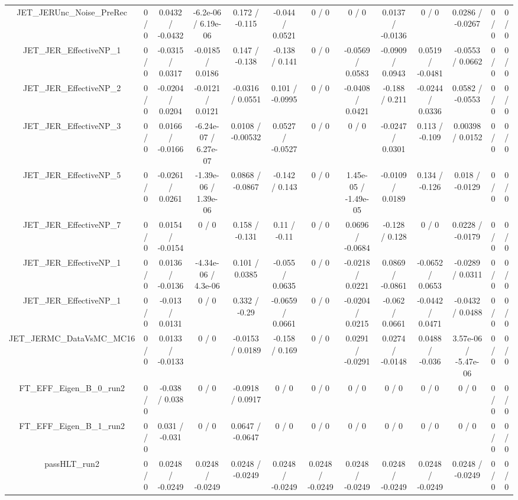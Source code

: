 \documentclass[10pt]{article}
\begin{document}
\begin{table}[htbp]
\begin{center}
\begin{tabular}{|c|c|c|c|c|c|c|c|c|c|c|c|c|}
  JET_JERUnc_Noise_PreRec & 0 / 0 & 0.0432 / -0.0432 & -6.2e-06 / 6.19e-06 & 0.172 / -0.115 & -0.044 / 0.0521 & 0 / 0 & 0 / 0 & 0.0137 / -0.0136 & 0 / 0 & 0.0286 / -0.0267 & 0 / 0 & 0 / 0 \\ 
  JET_JER_EffectiveNP_1 & 0 / 0 & -0.0315 / 0.0317 & -0.0185 / 0.0186 & 0.147 / -0.138 & -0.138 / 0.141 & 0 / 0 & -0.0569 / 0.0583 & -0.0909 / 0.0943 & 0.0519 / -0.0481 & -0.0553 / 0.0662 & 0 / 0 & 0 / 0 \\ 
  JET_JER_EffectiveNP_2 & 0 / 0 & -0.0204 / 0.0204 & -0.0121 / 0.0121 & -0.0316 / 0.0551 & 0.101 / -0.0995 & 0 / 0 & -0.0408 / 0.0421 & -0.188 / 0.211 & -0.0244 / 0.0336 & 0.0582 / -0.0553 & 0 / 0 & 0 / 0 \\ 
  JET_JER_EffectiveNP_3 & 0 / 0 & 0.0166 / -0.0166 & -6.24e-07 / 6.27e-07 & 0.0108 / -0.00532 & 0.0527 / -0.0527 & 0 / 0 & 0 / 0 & -0.0247 / 0.0301 & 0.113 / -0.109 & 0.00398 / 0.0152 & 0 / 0 & 0 / 0 \\ 
  JET_JER_EffectiveNP_5 & 0 / 0 & -0.0261 / 0.0261 & -1.39e-06 / 1.39e-06 & 0.0868 / -0.0867 & -0.142 / 0.143 & 0 / 0 & 1.45e-05 / -1.49e-05 & -0.0109 / 0.0189 & 0.134 / -0.126 & 0.018 / -0.0129 & 0 / 0 & 0 / 0 \\ 
  JET_JER_EffectiveNP_7 & 0 / 0 & 0.0154 / -0.0154 & 0 / 0 & 0.158 / -0.131 & 0.11 / -0.11 & 0 / 0 & 0.0696 / -0.0684 & -0.128 / 0.128 & 0 / 0 & 0.0228 / -0.0179 & 0 / 0 & 0 / 0 \\ 
  JET_JER_EffectiveNP_1 & 0 / 0 & 0.0136 / -0.0136 & -4.34e-06 / 4.3e-06 & 0.101 / 0.0385 & -0.055 / 0.0635 & 0 / 0 & -0.0218 / 0.0221 & 0.0869 / -0.0861 & -0.0652 / 0.0653 & -0.0289 / 0.0311 & 0 / 0 & 0 / 0 \\ 
  JET_JER_EffectiveNP_1 & 0 / 0 & -0.013 / 0.0131 & 0 / 0 & 0.332 / -0.29 & -0.0659 / 0.0661 & 0 / 0 & -0.0204 / 0.0215 & -0.062 / 0.0661 & -0.0442 / 0.0471 & -0.0432 / 0.0488 & 0 / 0 & 0 / 0 \\ 
  JET_JERMC_DataVsMC_MC16 & 0 / 0 & 0.0133 / -0.0133 & 0 / 0 & -0.0153 / 0.0189 & -0.158 / 0.169 & 0 / 0 & 0.0291 / -0.0291 & 0.0274 / -0.0148 & 0.0488 / -0.036 & 3.57e-06 / -5.47e-06 & 0 / 0 & 0 / 0 \\ 
  FT_EFF_Eigen_B_0_run2 & 0 / 0 & -0.038 / 0.038 & 0 / 0 & -0.0918 / 0.0917 & 0 / 0 & 0 / 0 & 0 / 0 & 0 / 0 & 0 / 0 & 0 / 0 & 0 / 0 & 0 / 0 \\ 
  FT_EFF_Eigen_B_1_run2 & 0 / 0 & 0.031 / -0.031 & 0 / 0 & 0.0647 / -0.0647 & 0 / 0 & 0 / 0 & 0 / 0 & 0 / 0 & 0 / 0 & 0 / 0 & 0 / 0 & 0 / 0 \\ 
  passHLT_run2 & 0 / 0 & 0.0248 / -0.0249 & 0.0248 / -0.0249 & 0.0248 / -0.0249 & 0.0248 / -0.0249 & 0.0248 / -0.0249 & 0.0248 / -0.0249 & 0.0248 / -0.0249 & 0.0248 / -0.0249 & 0.0248 / -0.0249 & 0 / 0 & 0 / 0 \\ 

\end{tabular}
\end{center}
\end{table}
\end{document}
